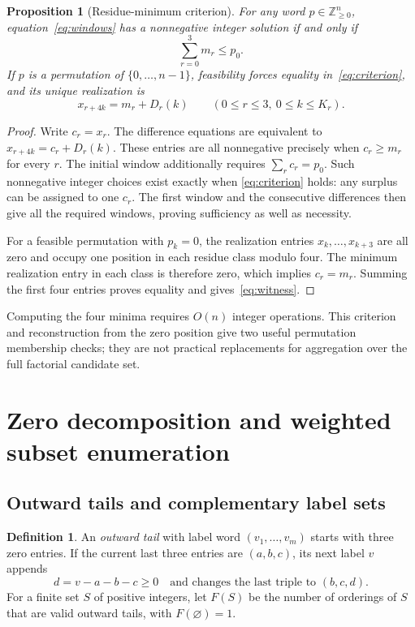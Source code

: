 \documentclass[11pt]{article}
\newtheorem{proposition}[theorem]{Proposition}
\theoremstyle{definition}
\newtheorem{definition}[theorem]{Definition}
\theoremstyle{remark}
\newcommand{\Znn}{\mathbb Z_{\geq0}}
\begin{document}
\begin{proposition}[Residue-minimum criterion]
\label{prop:criterion}
For any word $p\in\Znn^n$, equation~\eqref{eq:windows} has a nonnegative
integer solution if and only if
\begin{equation}
 \sum_{r=0}^3 m_r\leq p_0.
 \label{eq:criterion}
\end{equation}
If $p$ is a permutation of $\{0,\ldots,n-1\}$, feasibility forces equality
in~\eqref{eq:criterion}, and its unique realization is
\begin{equation}
 x_{r+4k}=m_r+D_r(k)\qquad(0\leq r\leq3,\ 0\leq k\leq K_r).
 \label{eq:witness}
\end{equation}
\end{proposition}
\begin{proof}
Write $c_r=x_r$. The difference equations are equivalent to
$x_{r+4k}=c_r+D_r(k)$. These entries are all nonnegative precisely when
$c_r\geq m_r$ for every $r$. The initial window additionally requires
$\sum_r c_r=p_0$. Such nonnegative integer choices exist exactly when
\eqref{eq:criterion} holds: any surplus can be assigned to one $c_r$.
The first window and the consecutive differences then give all the required
windows, proving sufficiency as well as necessity.

For a feasible permutation with $p_k=0$, the realization entries
$x_k,\ldots,x_{k+3}$ are all zero and occupy one position in each residue
class modulo four. The minimum realization entry in each class is therefore
zero, which implies $c_r=m_r$. Summing the first four entries proves equality and
gives~\eqref{eq:witness}.
\end{proof}

Computing the four minima requires $O(n)$ integer operations. This criterion
and reconstruction from the zero position give two useful permutation
membership checks; they are not practical replacements for aggregation over
the full factorial candidate set.

\section{Zero decomposition and weighted subset enumeration}
\label{sec:subset}

\subsection{Outward tails and complementary label sets}

\begin{definition}
\label{def:tail}
An \emph{outward tail} with label word $(v_1,\ldots,v_m)$ starts with
three zero entries. If the current last three entries are $(a,b,c)$, its
next label $v$ appends
\begin{equation}
 d=v-a-b-c\geq0
 \quad\text{and changes the last triple to }(b,c,d).
 \label{eq:transition}
\end{equation}
For a finite set $S$ of positive integers, let $F(S)$ be the number of
orderings of $S$ that are valid outward tails, with $F(\varnothing)=1$.
\end{definition}
\end{document}
